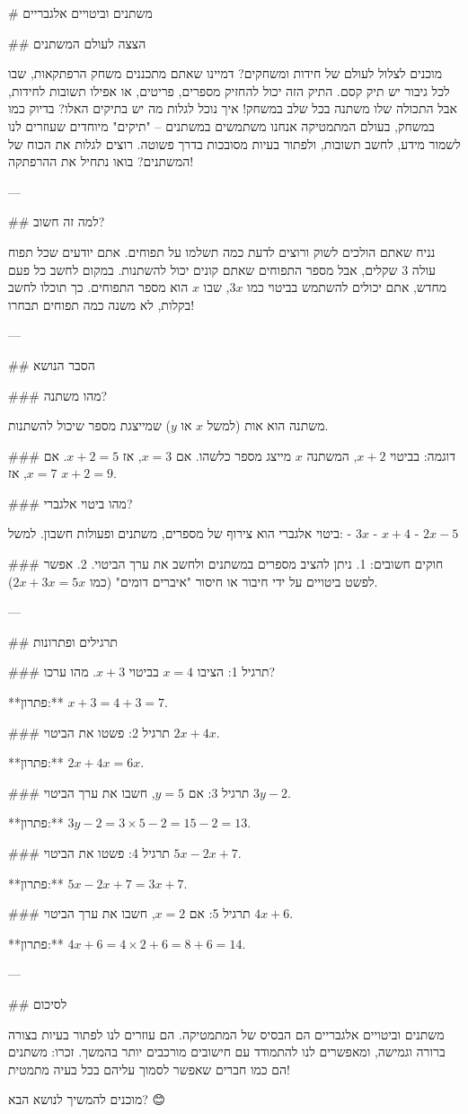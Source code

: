# משתנים וביטויים אלגבריים

## הצצה לעולם המשתנים

מוכנים לצלול לעולם של חידות ומשחקים? דמיינו שאתם מתכננים משחק הרפתקאות, שבו לכל גיבור יש תיק קסם. התיק הזה יכול להחזיק מספרים, פריטים, או אפילו תשובות לחידות, אבל התכולה שלו משתנה בכל שלב במשחק! איך נוכל לגלות מה יש בתיקים האלו? בדיוק כמו במשחק, בעולם המתמטיקה אנחנו משתמשים במשתנים – "תיקים" מיוחדים שעוזרים לנו לשמור מידע, לחשב תשובות, ולפתור בעיות מסובכות בדרך פשוטה. רוצים לגלות את הכוח של המשתנים? בואו נתחיל את ההרפתקה! 

---

## למה זה חשוב? 

נניח שאתם הולכים לשוק ורוצים לדעת כמה תשלמו על תפוחים. אתם יודעים שכל תפוח עולה 3 שקלים, אבל מספר התפוחים שאתם קונים יכול להשתנות. במקום לחשב כל פעם מחדש, אתם יכולים להשתמש בביטוי כמו $3x$, שבו $x$ הוא מספר התפוחים. כך תוכלו לחשב בקלות, לא משנה כמה תפוחים תבחרו!

---

## הסבר הנושא

### מהו משתנה?

משתנה הוא אות (למשל $x$ או $y$) שמייצגת מספר שיכול להשתנות.

### דוגמה:
בביטוי $x + 2$, המשתנה $x$ מייצג מספר כלשהו. אם $x = 3$, אז $x + 2 = 5$. אם $x = 7$, אז $x + 2 = 9$.

### מהו ביטוי אלגברי?

ביטוי אלגברי הוא צירוף של מספרים, משתנים ופעולות חשבון. למשל:
- $3x$
- $x + 4$
- $2x - 5$

### חוקים חשובים:
1. ניתן להציב מספרים במשתנים ולחשב את ערך הביטוי.
2. אפשר לפשט ביטויים על ידי חיבור או חיסור "איברים דומים" (כמו $2x + 3x = 5x$).

---

## תרגילים ופתרונות

### תרגיל 1:
הציבו $x = 4$ בביטוי $x + 3$. מהו ערכו?

**פתרון:** $x + 3 = 4 + 3 = 7$.

### תרגיל 2:
פשטו את הביטוי $2x + 4x$.

**פתרון:** $2x + 4x = 6x$.

### תרגיל 3:
אם $y = 5$, חשבו את ערך הביטוי $3y - 2$.

**פתרון:** $3y - 2 = 3 \times 5 - 2 = 15 - 2 = 13$.

### תרגיל 4:
פשטו את הביטוי $5x - 2x + 7$.

**פתרון:** $5x - 2x + 7 = 3x + 7$.

### תרגיל 5:
אם $x = 2$, חשבו את ערך הביטוי $4x + 6$.

**פתרון:** $4x + 6 = 4 \times 2 + 6 = 8 + 6 = 14$.

---

## לסיכום

משתנים וביטויים אלגבריים הם הבסיס של המתמטיקה. הם עוזרים לנו לפתור בעיות בצורה ברורה וגמישה, ומאפשרים לנו להתמודד עם חישובים מורכבים יותר בהמשך. זכרו: משתנים הם כמו חברים שאפשר לסמוך עליהם בכל בעיה מתמטית! 

מוכנים להמשיך לנושא הבא? 😊